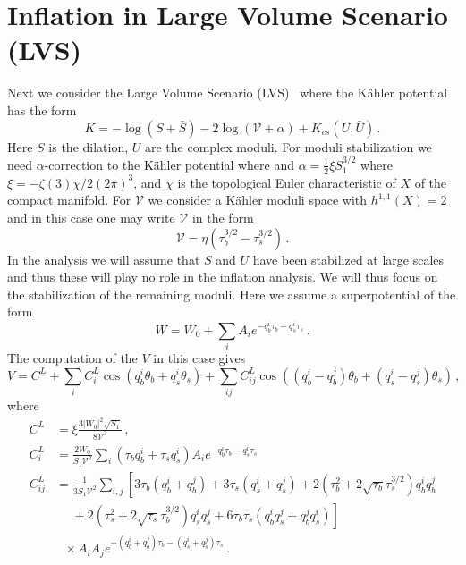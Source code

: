 \documentclass[12pt]{article}
\begin{document}

\section{Inflation in Large Volume Scenario (LVS) \label{sec:LVS}}
Next we consider the Large Volume Scenario (LVS)~\cite{Balasubramanian:2005zx} where the K\"ahler potential has the form
\begin{equation}
  K = - \log\left(S + \bar S\right)
      - 2 \log\left(\mathcal{V} + \alpha\right)
      + K_{cs}\left(U, \bar U\right)\,.
\end{equation}
Here $S$ is the dilation, $U$ are the complex moduli.
For moduli stabilization we need $\alpha$-correction to the K\"ahler potential where and $\alpha = \frac{1}{2} \xi S_1^{3 / 2}$ where $\xi = -\zeta\left(3\right) \chi / 2 \left(2 \pi\right)^3$, and $\chi$ is the topological Euler characteristic of $X$ of the compact manifold.
For $\mathcal{V}$ we consider a K\"ahler moduli space with $h^{1, 1}\left(X\right) = 2$ and in this case one may write $\mathcal{V}$ in the form
\begin{equation}
  \mathcal{V} = \eta \left(\tau_b^{3 / 2} - \tau_s^{3 / 2}\right)\,.
\end{equation}
In the analysis we will assume that $S$ and $U$ have been stabilized at large scales and thus these will play no role in the inflation analysis.
We will thus focus on the stabilization of the remaining moduli.
Here we assume a superpotential of the form
\begin{equation}
  W = W_0 + \sum_i A_i e^{-q^i_b \tau_b - q^i_s \tau_s}\,.
\end{equation}
The computation of the $V$ in this case gives
\begin{equation}
  V = C^L
    + \sum_i C^L_i \cos\left(q_b^i \theta_b + q^i_s \theta_s\right)
    + \sum_{ij} C^L_{ij} \cos\left(
        \left(q_b^i - q_b^j\right) \theta_b
      + \left(q_s^i - q_s^j\right) \theta_s
    \right)\,,
\end{equation}
where
\begin{equation}
    \begin{aligned}
    C^L &= \xi \frac{3 \left|W_0\right|^2 \sqrt{S_1}}{8 \mathcal{V}^3}\,,\\
    C^L_i &= \frac{2 W_0}{S_1 \mathcal{V}^2} \sum_i \left(\tau_b q_b^i + \tau_s q_s^i\right) A_i
        e^{-q_b^i \tau_b - q_s^i \tau_s}\,\\
    C^L_{ij} &= \frac{1}{3 S_1 \mathcal{V}^2} \sum_{i, j} \left[
        3 \tau_b \left(q^i_b + q^j_b\right)
        + 3 \tau_s \left(q_s^i + q_s^j\right)
        + 2 \left(\tau_b^2 + 2 \sqrt{\tau_b} \tau_s^{3 / 2}\right) q_b^i q_b^j\right.\\
        &~~~~~~ \left.{}
        + 2 \left(\tau^2_s + 2 \sqrt{\tau_s} \tau^{3 / 2}_b\right) q_s^i q_s^j
        + 6 \tau_b \tau_s \left(q_b^i q_s^j + q_b^j q_s^i\right)
    \right]\\
    &~~~ \times A_i A_j
        e^{-\left(q_b^i + q_b^j\right) \tau_b - \left(q_s^i + q_s^j\right) \tau_s}\,.
    \end{aligned}
\end{equation}
\end{document}
